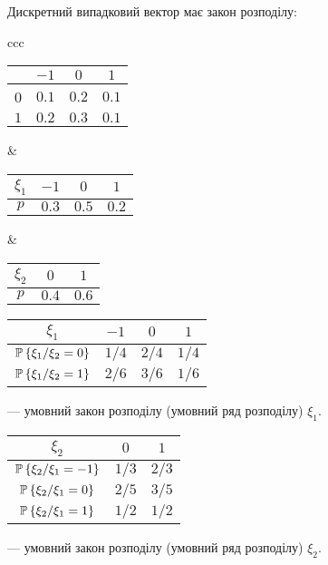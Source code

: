 \begin{example}
    Дискретний випадковий вектор має закон розподілу:

    \begin{tabular}{ccc}
        \begin{tabular}{|c|c|c|c|}
            \hline
            \diagbox{$\xi_2$}{$\xi_1$} & $-1$ & $0$ & $1$\\
            \hline
            0 & $0.1$ & $0.2$ & $0.1$ \\
            \hline
            $1$ & $0.2$ & $0.3$ & $0.1$ \\
            \hline
        \end{tabular}
        &
        \begin{tabular}{|c|c|c|c|}
            \hline
            $\xi_1$ & $-1$ & $0$ & $1$ \\
            \hline
            $p$ & $0.3$ & $0.5$ & $0.2$ \\
            \hline
        \end{tabular}
        &
        \begin{tabular}{|c|c|c|}
            \hline
            $\xi_2$ & $0$ & $1$ \\
            \hline
            $p$ & $0.4$ & $0.6$ \\
            \hline
        \end{tabular}
    \end{tabular}
\end{example}

\begin{tabular}{|c|c|c|c|}
    \hline
    $\xi_1$ & $-1$ & $0$ & $1$ \\
    \hline
    $\P\left\{\xi_1 / \xi_2 = 0\right\}$ & $1/4$ 
    & $2/4$ & $1/4$ \\
    \hline
    $\P\left\{\xi_1 / \xi_2 = 1\right\}$ & $2/6$ 
    & $3/6$ & $1/6$ \\
    \hline
\end{tabular}
--- умовний закон розподілу (умовний ряд розподілу) $\xi_1$.

\begin{tabular}{|c|c|c|}
    \hline
    $\xi_2$ & $0$ & $1$ \\
    \hline
    $\P\left\{\xi_2 / \xi_1 = -1\right\}$ & $1/3$ 
    & $2/3$ \\
    \hline
    $\P\left\{\xi_2 / \xi_1 = 0\right\}$ & $2/5$ 
    & $3/5$\\
    \hline
    $\P\left\{\xi_2 / \xi_1 = 1\right\}$ & $1/2$ 
    & $1/2$\\
    \hline
\end{tabular}
--- умовний закон розподілу (умовний ряд розподілу) $\xi_2$.


